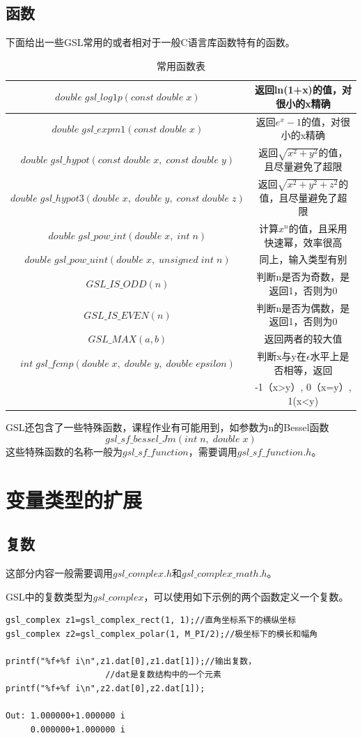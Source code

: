 \documentclass[a4paper,11pt,onecolumn,twoside]{article}
\begin{document}
\subsection{函数}
下面给出一些GSL常用的或者相对于一般C语言库函数特有的函数。
\begin{table}
\centering
\renewcommand\arraystretch{2}
\caption{常用函数表}
\begin{tabular}{|c|c|}
\hline

$double\;gsl\_log1p(const\;double\;x)$&返回ln(1+x)的值，对很小的x精确\\\hline
$double\;gsl\_expm1(const\;double\;x)$ &返回$e^x-1$的值，对很小的x精确\\\hline
$double\;gsl\_hypot(const\;double\;x,\;const\;double\;y)$&返回$\sqrt{x^2+y^2}$的值，且尽量避免了超限\\\hline
$double\;gsl\_hypot3(double\;x,\;double\;y,\;const\;double\;z)$&返回$\sqrt{x^2+y^2+z^2}$的值，且尽量避免了超限\\\hline
$double\;gsl\_pow\_int(double\;x,\;int\;n)$&计算$x^n$的值，且采用快速幂，效率很高\\\hline
$double\;gsl\_pow\_uint(double\;x,\;unsigned\;int\;n)$&同上，输入类型有别\\\hline
$GSL\_IS\_ODD(n)$&判断n是否为奇数，是返回1，否则为0\\\hline
$GSL\_IS\_EVEN(n)$&判断n是否为偶数，是返回1，否则为0\\\hline
$GSL\_MAX(a,b)$&返回两者的较大值\\\hline
$int\;gsl\_fcmp(double\;x,\;double\;y,\;double\;epsilon)$&判断x与y在$\epsilon$水平上是否相等，返回\\
&-1（x>y）, 0（x=y）, 1(x<y)\\\hline
\end{tabular}
\end{table}
GSL还包含了一些特殊函数，课程作业有可能用到，如参数为n的Bessel函数
$$
gsl\_sf\_bessel\_Jm(int\; n,\; double\; x)
$$
这些特殊函数的名称一般为$gsl\_sf\_function$，需要调用$gsl\_sf\_function.h$。




\section{变量类型的扩展}
\subsection{复数}
这部分内容一般需要调用$gsl\_complex.h$和$gsl\_complex\_math.h$。\par GSL中的复数类型为$gsl\_complex$，可以使用如下示例的两个函数定义一个复数。
\begin{lstlisting}
gsl_complex z1=gsl_complex_rect(1, 1);//直角坐标系下的横纵坐标
gsl_complex z2=gsl_complex_polar(1, M_PI/2);//极坐标下的模长和幅角
    
printf("%f+%f i\n",z1.dat[0],z1.dat[1]);//输出复数，
					//dat是复数结构中的一个元素
printf("%f+%f i\n",z2.dat[0],z2.dat[1]);

Out: 1.000000+1.000000 i
     0.000000+1.000000 i
\end{lstlisting}
\end{document}
